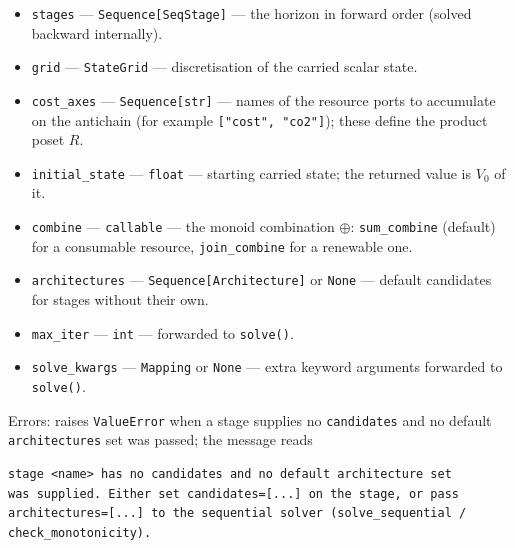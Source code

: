 \documentclass[11pt,a4paper]{article}
\begin{document}
\begin{itemize}[nosep]
  \item \texttt{stages} --- \texttt{Sequence[SeqStage]} --- the horizon in
    forward order (solved backward internally).
  \item \texttt{grid} --- \texttt{StateGrid} --- discretisation of the
    carried scalar state.
  \item \texttt{cost\_axes} --- \texttt{Sequence[str]} --- names of the
    resource ports to accumulate on the antichain (for example
    \texttt{["cost", "co2"]}); these define the product poset $R$.
  \item \texttt{initial\_state} --- \texttt{float} --- starting carried
    state; the returned value is $V_0$ of it.
  \item \texttt{combine} --- \texttt{callable} --- the monoid combination
    $\oplus$: \texttt{sum\_combine} (default) for a consumable resource,
    \texttt{join\_combine} for a renewable one.
  \item \texttt{architectures} --- \texttt{Sequence[Architecture]} or
    \texttt{None} --- default candidates for stages without their own.
  \item \texttt{max\_iter} --- \texttt{int} --- forwarded to
    \texttt{solve()}.
  \item \texttt{solve\_kwargs} --- \texttt{Mapping} or \texttt{None} ---
    extra keyword arguments forwarded to \texttt{solve()}.
\end{itemize}
Errors: raises \texttt{ValueError} when a stage supplies no
\texttt{candidates} and no default \texttt{architectures} set was passed; the
message reads
\begin{lstlisting}[language={},numbers=none,keywordstyle={}]
stage <name> has no candidates and no default architecture set
was supplied. Either set candidates=[...] on the stage, or pass
architectures=[...] to the sequential solver (solve_sequential /
check_monotonicity).
\end{lstlisting}
\end{document}
